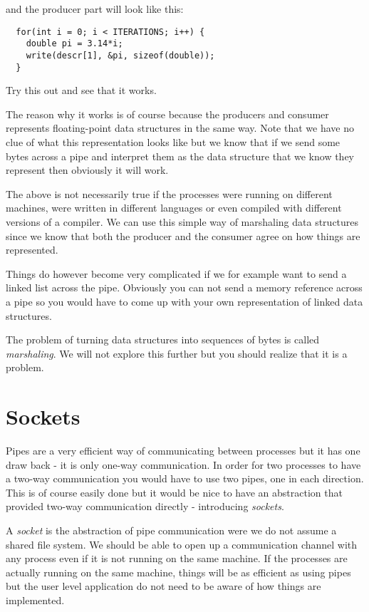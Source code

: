 \documentclass[a4paper,11pt]{article}
\begin{document}
and the producer part will look like this:

\begin{lstlisting}
  for(int i = 0; i < ITERATIONS; i++) {
    double pi = 3.14*i;
    write(descr[1], &pi, sizeof(double));
  }
\end{lstlisting}

Try this out and see that it works. 

The reason why it works is of course because the producers and
consumer represents floating-point data structures in the same way. Note
that we have no clue of what this representation looks like but we
know that if we send some bytes across a pipe and interpret them as
the data structure that we know they represent then obviously it will
work. 

The above is not necessarily true if the processes were running on
different machines, were written in different languages or even
compiled with different versions of a compiler. We can use this simple
way of marshaling data structures since we know that both the
producer and the consumer agree on how things are represented.

Things do however become very complicated if we for example want to
send a linked list across the pipe. Obviously you can not send a
memory reference across a pipe so you would have to come up with your
own representation of linked data structures.

The problem of turning data structures into sequences of bytes is
called {\em marshaling}. We will not explore this further but you
should realize that it is a problem.

\section{Sockets}

Pipes are a very efficient way of communicating between processes but
it has one draw back - it is only one-way communication. In order for
two processes to have a two-way communication you would have to use
two pipes, one in each direction. This is of course easily done but it
would be nice to have an abstraction that provided two-way
communication directly - introducing {\em sockets}.


A {\em socket} is the abstraction of pipe communication were we do not
assume a shared file system. We should be able to open up a
communication channel with any process even if it is not running on
the same machine. If the processes are actually running on the same
machine, things will be as efficient as using pipes but the user level
application do not need to be aware of how things are implemented.
\end{document}
